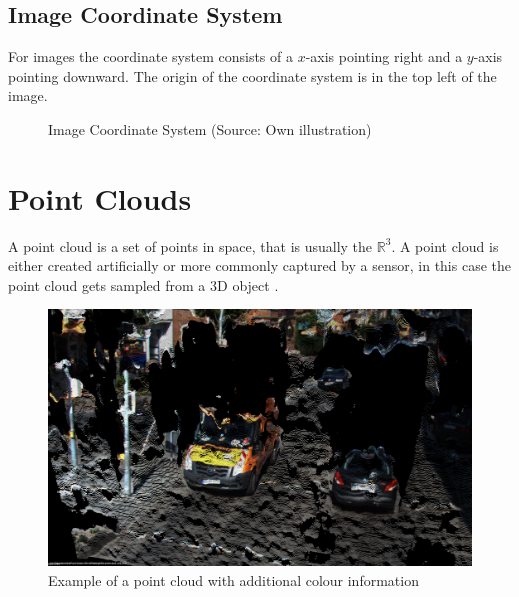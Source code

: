 \subsection{Image Coordinate System} \label{sec:theo:imageCoord}
For images the coordinate system consists of a $x$-axis pointing right and a $y$-axis pointing downward. The origin of the coordinate system is in the top left of the image.

\begin{figure}[h!]
    \centering
    \caption{Image Coordinate System (Source: Own illustration)}
\end{figure}

\section{Point Clouds}
A point cloud is a set of points in space, that is usually the $\mathbb{R}^3$. A point cloud is either created artificially or more commonly captured by a sensor, in
this case the point cloud gets sampled from a 3D object \cite{pclAbout}.

\begin{figure}[h!]
    \centering
    \includegraphics[width=\textwidth]{../Material/pointcloud.png}
    \caption{Example of a point cloud with additional colour information}
    \label{fig:theo:pc}
\end{figure}

